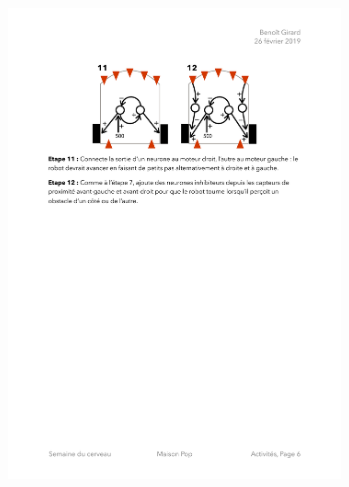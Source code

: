 \documentclass[12pt]{article}
\begin{document}
\begin{center}
\includegraphics[width=0.66\textwidth]{../Etapes11-12.pdf}
\end{center}
\end{document}
